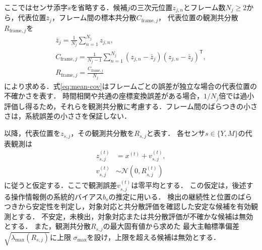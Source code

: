 \documentclass{sice-si}
\newenvironment{dotsubequations}{%
  \begin{subequations}
  \renewcommand{\theequation}{\theparentequation.\arabic{equation}}%
}{\end{subequations}}
\begin{document}
ここではセンサ添字$s$を省略する．候補$j$の三次元位置$z_{j,n}$とフレーム数$N_j\geq2$から，代表位置$\bar z_j$，フレーム間の標本共分散$C_{\mathrm{frame},j}$，
代表位置の観測共分散$R_{\mathrm{frame},j}$を
\begin{dotsubequations}
\begin{align}
\bar z_j=\frac{1}{N_j}\sum_{n=1}^{N_j}z_{j,n},
\label{eq:mean}\\
C_{\mathrm{frame},j}=\frac{1}{N_j-1}\sum_{n=1}^{N_j}
(z_{j,n}-\bar z_j)(z_{j,n}-\bar z_j)^{\mathsf T},
\label{eq:sample-cov}\\
R_{\mathrm{frame},j}=\frac{C_{\mathrm{frame},j}}{N_j}
\label{eq:mean-cov}
\end{align}
\end{dotsubequations}
により求める．式\eqref{eq:mean-cov}はフレームごとの誤差が独立な場合の代表位置の不確かさを表す．
時間相関や共通の座標変換誤差がある場合，$1/N_j$倍では過小評価し得るため，それらを観測共分散に考慮する．フレーム間のばらつきの小ささは，系統誤差の小ささを保証しない．

以降，代表位置を$z_{s,j}$，その観測共分散を$R_{s,j}$と表す．
各センサ$s\in\{Y,M\}$の代表観測は
\begin{dotsubequations}
\label{eq:observation-model}
\begin{align}
z_{s,j}^{(t)} &= x^{(t)}+v_{s,j}^{(t)},\\
v_{s,j}^{(t)} &\sim \mathcal{N}(0,R_{s,j}^{(t)})
\end{align}
\end{dotsubequations}
に従うと仮定する．ここで観測誤差$v_{s,j}^{(t)}$は零平均とする．
この仮定は，後述する操作情報側の系統的バイアス$b_o$の推定に用いる．
検出の継続性と位置のばらつきから安定性を判定し，対象対応と共分散評価を確認した安定な候補を有効観測とする．
不安定，未検出，対象対応または共分散評価が不確かな候補は無効とする．
また，観測共分散$R_{s,j}$の最大固有値から求めた
最大主軸標準偏差$\sqrt{\lambda_{\max}(R_{s,j})}$に上限
$\sigma_{\max}$を設け，上限を超える候補は無効とする．
\end{document}
